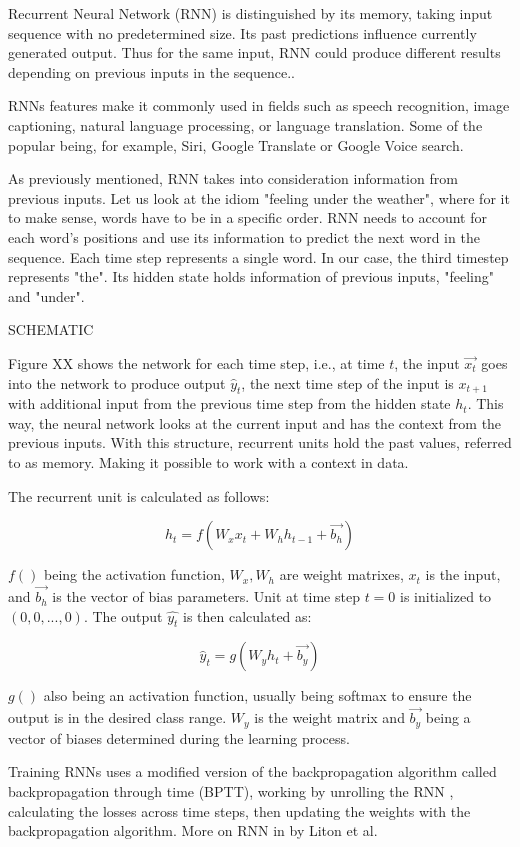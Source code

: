 Recurrent Neural Network (RNN) is distinguished by its memory, taking input sequence with no predetermined size. Its past predictions influence currently generated output. Thus for the same input, RNN could produce different results depending on previous inputs in the sequence.\cite{rnnDSmedium}.

{\color{red}
RNNs features make it commonly used in fields such as speech recognition, image captioning, natural language processing, or language translation. Some of the popular being, for example, Siri, Google Translate or Google Voice search.\cite{ibmrnn}

As previously mentioned, RNN takes into consideration information from previous inputs. Let us look at the idiom "feeling under the weather", where for it to make sense, words have to be in a specific order. RNN needs to account for each word's positions and use its information to predict the next word in the sequence. Each time step represents a single word. In our case, the third timestep represents "the". Its hidden state holds information of previous inputs, "feeling" and "under".\cite{ibmrnn}
}

SCHEMATIC

Figure XX shows the network for each time step, i.e., at time $t$, the input $\vec{x_t}$ goes into the network to produce output $\hat{y}_t$, the next time step of the input is $x_{t+1}$ with additional input from the previous time step from the hidden state $h_{t}$. This way, the neural network looks at the current input and has the context from the previous inputs.
With this structure, recurrent units hold the past values, referred to as memory. Making it possible to work with a context in data.
\cite{rnnin6}

The recurrent unit is calculated as follows:

\begin{equation}
    {h_t = f(W_{x}x_t + W_{h}h_{t-1}+\vec{b_h})}
\end{equation}

$f()$ being the activation function, $W_x,W_h$ are weight matrixes, $x_t$ is the input, and $\vec{b_h}$ is the vector of bias parameters. Unit at time step $t=0$ is initialized to $(0,0,...,0)$. The output $\hat{y_t}$ is then calculated as:

\begin{equation}
    {\hat{y}_t = g(W_{y}h_t + \vec{b_y})}
\end{equation}

$g()$ also being an activation function, usually being softmax to ensure the output is in the desired class range. $W_y$ is the weight matrix and $\vec{b_y}$ being a vector of biases determined during the learning process.

Training RNNs uses a modified version of the backpropagation algorithm called backpropagation through time (BPTT), working by unrolling the RNN \cite{Goodfellow-et-al-2016}, calculating the losses across time steps, then updating the weights with the backpropagation algorithm. More on RNN in \cite{lipton2015critical} by Liton et al.





